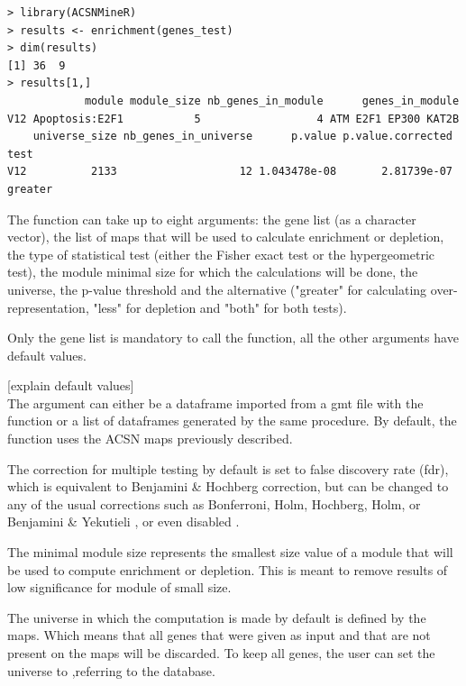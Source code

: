 \documentclass[article]{jss}
\begin{document}
\begin{verbatim}
> library(ACSNMineR)
> results <- enrichment(genes_test)
> dim(results)
[1] 36  9
> results[1,]
            module module_size nb_genes_in_module      genes_in_module
V12 Apoptosis:E2F1           5                  4 ATM E2F1 EP300 KAT2B
    universe_size nb_genes_in_universe      p.value p.value.corrected    test
V12          2133                   12 1.043478e-08       2.81739e-07 greater
\end{verbatim}



The  function can take up to eight arguments: the gene list (as
a character vector), the list of maps that will be used to calculate enrichment
or depletion, the type of statistical test (either the Fisher exact test or the
hypergeometric test), the module minimal size for which the calculations will be
done, the universe, the p-value threshold and the alternative ("greater" for
calculating over-representation, "less" for depletion and "both" for both
tests).

Only the gene list is mandatory to call the  function, all the
other arguments have default values.  

[explain default values]\\
The  argument can either be a dataframe imported from a gmt file with the  function or a list of dataframes generated by the same procedure. By default, the function uses the ACSN maps previously described.

The correction for multiple testing by default is set to false discovery rate (fdr), which is equivalent to Benjamini \& Hochberg correction, but can be changed to any of the usual corrections such as Bonferroni, Holm, Hochberg, Holm, or Benjamini \& Yekutieli \citep{Benjamini2003FDR}, or even disabled .

The minimal module size represents the smallest size value of a module that will be used to compute enrichment or depletion. This is meant to remove results of low significance for module of small size.

The universe in which the computation is made by default is defined by the maps. Which means that all genes that were given as input and that are not present on the maps will be discarded. To keep all genes, the user can set the universe to ,referring to the database.
\end{document}

